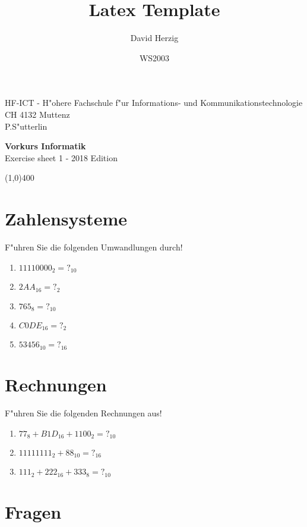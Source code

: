\documentclass[a4paper,10pt]{article}
\title{Latex Template}
\author{David Herzig}
\date{WS2003}
\begin{document}
HF-ICT - H"ohere Fachschule f"ur Informations- und Kommunikationstechnologie\\
CH 4132 Muttenz\\
P.S"utterlin

\vspace{2mm}

\begin{center}
{\Large \bf Vorkurs Informatik}\\
Exercise sheet 1 - 2018 Edition
\end{center}

\vspace{2mm}

\line(1,0){400}

\vspace{5mm}

\section{Zahlensysteme}

F"uhren Sie die folgenden Umwandlungen durch!

\begin{enumerate}
\item $11110000_{2} = ?_{10}$     %
\item $2AA_{16} = ?_{2}$                %
\item $765_{8} = ?_{10}$                %
\item $C0DE_{16} = ?_{2}$             %
\item $53456_{10} = ?_{16}$         %
\end{enumerate}

\section{Rechnungen}
F"uhren Sie die folgenden Rechnungen aus!

\begin{enumerate}
\item $77_{8} + B1D_{16} + 1100_{2} = ?_{10}$   %
\item $11111111_{2} + 88_{10} = ?_{16}$           %
\item $111_{2} + 222_{16} + 333_{8} = ?_{10}$     %
\end{enumerate}


\section{Fragen}
\end{document}
